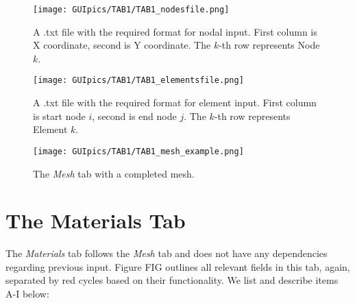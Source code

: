 \begin{figure}
	\centering
	\texttt{[image: GUIpics/TAB1/TAB1\_nodesfile.png]}
	\caption{A .txt file with the required format for nodal input. First column 
	is X coordinate, second is Y coordinate. The $k$-th row represents Node 
	$k$.}
	\label{fig:TAB1_nodesfile}
\end{figure}
\begin{figure}
	\centering
	\texttt{[image: GUIpics/TAB1/TAB1\_elementsfile.png]}
	\caption{A .txt file with the required format for element input. First 
	column is start node $i$, second is end node $j$. The $k$-th row represents 
	Element $k$.}
	\label{fig:TAB1_elementsfile}
\end{figure}

\begin{figure}
	\centering
	\texttt{[image: GUIpics/TAB1/TAB1\_mesh\_example.png]}
	\caption{The \textit{Mesh} tab with a completed mesh.}
	\label{fig:TAB1_mesh_example}
\end{figure}


\section{The Materials Tab}

The \textit{Materials} tab follows the \textit{Mesh} tab and does not have any 
dependencies regarding previous input. Figure FIG outlines all relevant fields 
in this tab, again, separated by red cycles based on their functionality. We 
list and describe items A-I below:

